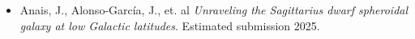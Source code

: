 \begin{itemize}   
\item {Anais, J., Alonso-García, J., et. al \textit{Unraveling the Sagittarius dwarf spheroidal galaxy at low Galactic latitudes}. Estimated submission 2025.}
\end{itemize}

